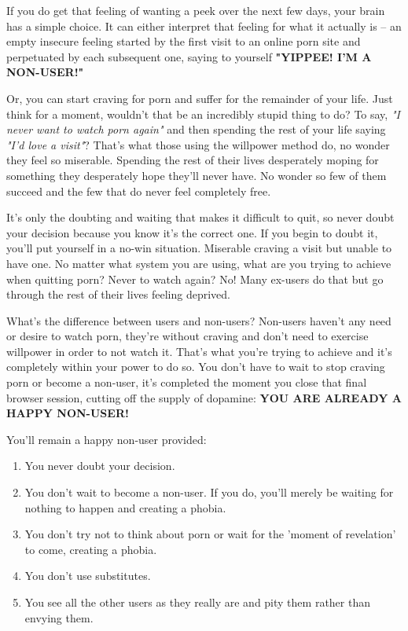 \documentclass[easypeasy.tex]{subfiles}
\begin{document}
If you do get that feeling of wanting a peek over the next few days, your brain has a simple choice. It can either interpret that feeling for what it actually is -- an empty insecure feeling started by the first visit to an online porn site and perpetuated by each subsequent one, saying to yourself \textbf{"YIPPEE! I'M A NON-USER!"}

Or, you can start craving for porn and suffer for the remainder of your life. Just think for a moment, wouldn't that be an incredibly stupid thing to do? To say, \textit{"I never want to watch porn again"} and then spending the rest of your life saying \textit{"I'd love a visit"}? That's what those using the willpower method do, no wonder they feel so miserable. Spending the rest of their lives desperately moping for something they desperately hope they'll never have. No wonder so few of them succeed and the few that do never feel completely free.

It's only the doubting and waiting that makes it difficult to quit, so never doubt your decision because you know it's the correct one. If you begin to doubt it, you'll put yourself in a no-win situation. Miserable craving a visit but unable to have one. No matter what system you are using, what are you trying to achieve when quitting porn? Never to watch again? No! Many ex-users do that but go through the rest of their lives feeling deprived.

What's the difference between users and non-users? Non-users haven't any need or desire to watch porn, they're without craving and don't need to exercise willpower in order to not watch it. That's what you're trying to achieve and it's completely within your power to do so. You don't have to wait to stop craving porn or become a non-user, it's completed the moment you close that final browser session, cutting off the supply of dopamine: \textbf{YOU ARE ALREADY A HAPPY NON-USER!}

  You'll remain a happy non-user provided:
\begin{enumerate}
  \item You never doubt your decision.
  \item You don't wait to become a non-user. If you do, you'll merely be waiting for nothing to happen and creating a phobia.
  \item You don't try not to think about porn or wait for the 'moment of revelation' to come, creating a phobia.
  \item You don't use substitutes.
  \item You see all the other users as they really are and pity them rather than envying them.
\end{enumerate}
  
\end{document}
